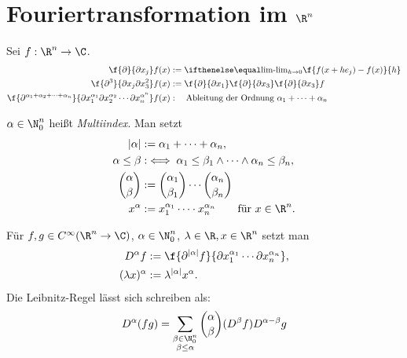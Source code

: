 \section{Fouriertransformation im \texorpdfstring{$\R^n$}{Rn}}


\begin{nt*}[Erinnerung]
	Sei $f : \R^n \to \C$.
	\begin{align*}
		\f{\partial }{\partial x_j}f(x) &:= \lim_{h\to 0} \f {f(x+he_j)-f(x)}{h} \\
		\f{\partial^3 }{\partial x_j \partial x_3^2}f(x) &:= \f{\partial }{\partial x_1}\f{\partial }{\partial x_3}\f{\partial }{\partial x_3} f \\
		\f{\partial^{\alpha_1 + \alpha_2 + \dotsb + \alpha_n} }{\partial x_1^{\alpha_1} \partial x_2^{\alpha_2} \dotsb \partial x_n^{\alpha^n}}f(x)  &: \quad \text{Ableitung der Ordnung $\alpha_1 + \dotsb + \alpha_n$}
	\end{align*}
\end{nt*}

\begin{df} \label{4.27}
	$\alpha \in \N_0^n$ heißt \emph{Multiindex}.
	Man setzt
	\begin{align*}
		|\alpha| &:= \alpha_1 + \dotsb + \alpha_n, \\
		\alpha \le \beta &:\iff \alpha_1 \le \beta_1 \land \dotsb \land \alpha_n \le \beta_n, \\
		\binom{\alpha}{\beta} &:= \binom{\alpha_1}{\beta_1}  \dotsb \binom{\alpha_n}{\beta_n} \\
		x^\alpha &:= x_1^{\alpha_1}  \dotsb \cdot x_n^{\alpha_n} \qquad \text{für $x\in \R^n$.}
	\end{align*}
\end{df}

\begin{ex}[Anwendung] \label{4.28}
	Für $f, g \in C^\infty (\R^n \to \C)$, $\alpha \in \N_0^n$, $\lambda \in \R, x \in \R^n$ setzt man
	\begin{align*}
		D^\alpha f &:= \f {\partial^{|\alpha|}f}{\partial x_1^{\alpha_1} \dotsb \partial x_n^{\alpha_n}},\\
		(\lambda x)^\alpha &:= \lambda^{|\alpha|} x^\alpha.
	\end{align*}
	Die Leibnitz-Regel lässt sich schreiben als:
	\[
		D^\alpha(f g) = \sum_{\substack{\beta \in \N_0^n \\ \beta \le \alpha}} \binom{\alpha}{\beta} (D^\beta f)D^{\alpha - \beta} g
	\]
\end{ex}

